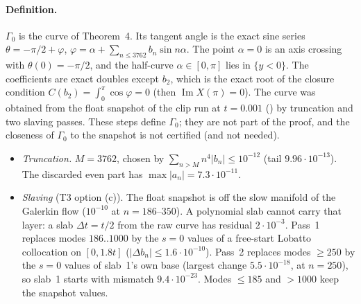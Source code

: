 \documentclass[11pt]{article}
\theoremstyle{definition}
\theoremstyle{remark}
\newcommand{\fn}[1]{\texttt{\detokenize{#1}}}
\newcommand{\abs}[1]{\lvert #1\rvert}
\begin{document}
\paragraph{Definition.} $\Gamma_0$ is the curve of Theorem~4. Its tangent angle is the exact sine series $\theta=-\pi/2+\varphi$, $\varphi=\alpha+\sum_{n\le3762}b_n\sin n\alpha$. The point $\alpha=0$ is an axis crossing with $\theta(0)=-\pi/2$, and the half-curve $\alpha\in[0,\pi]$ lies in $\{y<0\}$. The coefficients are exact doubles except $b_2$, which is the exact root of the closure condition $C(b_2)=\int_0^\pi\cos\varphi=0$ (then $\operatorname{Im}X(\pi)=0$). The curve was obtained from the float snapshot of the clip run at $t=0.001$ (\fn{p2_t0.001.npz}) by truncation and two slaving passes. These steps define $\Gamma_0$; they are not part of the proof, and the closeness of $\Gamma_0$ to the snapshot is not certified (and not needed).
\begin{itemize}
\item \emph{Truncation.} $M=3762$, chosen by $\sum_{n>M}n^4\abs{b_n}\le10^{-12}$ (tail $9.96\cdot10^{-13}$). The discarded even part has $\max\abs{a_n}=7.3\cdot10^{-11}$.
\item \emph{Slaving} (T3 option (c)). The float snapshot is off the slow manifold of the Galerkin flow ($10^{-10}$ at $n=186$--$350$). A polynomial slab cannot carry that layer: a slab $\Delta t=t/2$ from the raw curve has residual $2\cdot10^{-3}$. Pass~1 replaces modes $186..1000$ by the $s=0$ values of a free-start Lobatto collocation on $[0,1.8t]$ ($\abs{\Delta b_n}\le1.6\cdot10^{-10}$). Pass~2 replaces modes $\ge250$ by the $s=0$ values of slab~1's own base (largest change $5.5\cdot10^{-18}$, at $n=250$), so slab~1 starts with mismatch $9.4\cdot10^{-23}$. Modes $\le185$ and $>1000$ keep the snapshot values.
\end{itemize}
\end{document}
